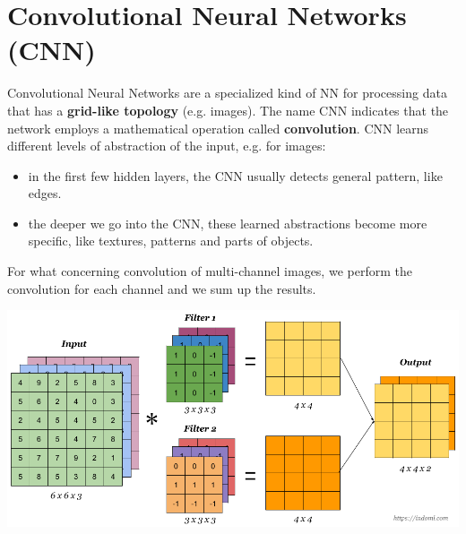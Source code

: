 \section{Convolutional Neural Networks (CNN)}
Convolutional Neural Networks are a specialized kind of NN for processing data that has a \textbf{grid-like topology} (e.g. images). The name CNN indicates that the network employs a mathematical operation called \textbf{convolution}.\newline\newline
CNN learns different levels of abstraction of the input, e.g. for images:
\begin{itemize}
    \item in the first few hidden layers, the CNN usually detects general pattern, like edges.

    \item the deeper we go into the CNN, these learned abstractions become more specific, like textures, patterns and parts of objects.

\end{itemize}
For what concerning convolution of multi-channel images, we perform the convolution for each channel and we sum up the results.
\begin{center}
    \includegraphics[scale = 0.3]{images/Convolution.png}
\end{center}

